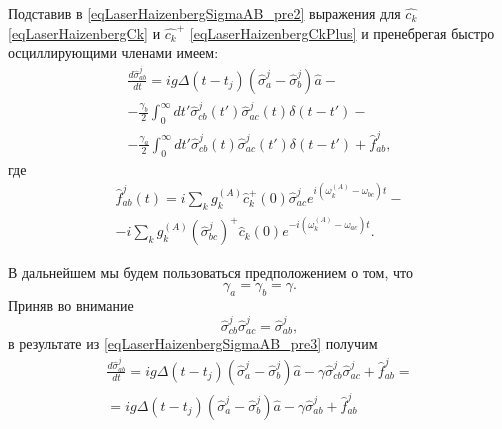 Подставив в \eqref{eqLaserHaizenbergSigmaAB_pre2} выражения для
$\hat{c_k}$ \eqref{eqLaserHaizenbergCk} и $\hat{c_k}^{+}$
\eqref{eqLaserHaizenbergCkPlus} и пренебрегая быстро осциллирующими
членами имеем:
\begin{eqnarray}
\frac{d \hat{\sigma}_{ab}^j}{d t} = 
i g 
\Delta\left(t - t_j\right) 
\left(\hat{\sigma}^{j}_{a} -
\hat{\sigma}^{j}_{b}\right)\hat{a} -
\nonumber \\
- \frac{\gamma_{b}}{2}
\int_0^{\infty}dt'
\hat{\sigma}^{j}_{cb}\left(t'\right)  
\hat{\sigma}^{j}_{ac}\left(t\right) 
\delta\left(t - t'\right) -
\nonumber \\ 
- \frac{\gamma_{a}}{2}
\int_0^{\infty}dt'
\hat{\sigma}^{j}_{cb}\left(t\right)  
\hat{\sigma}^{j}_{ac}\left(t'\right) 
\delta\left(t - t'\right) + \hat{f}_{ab}^{j},
\label{eqLaserHaizenbergSigmaAB_pre3}
\end{eqnarray}
где
\begin{eqnarray}
\hat{f}_{ab}^{j}\left(t\right) = 
i
\sum_{k}
g_k^{(A)}
\hat{c}_k^{+}\left(0\right)
\hat{\sigma}^{j}_{ac}  
e^{i\left(\omega_k^{(A)} - \omega_{bc}\right)t} -
\nonumber \\
-
 i
\sum_{k}
g_k^{(A)}
\left(\hat{\sigma}^{j}_{bc}\right)^{+}\hat{c}_k\left(0\right)
e^{-i\left(\omega_k^{(A)} - \omega_{ac}\right)t}.
\label{eqLaserHaizenbergFABJ}
\end{eqnarray}

В дальнейшем мы будем пользоваться предположением о том, что
\begin{equation}
\gamma_{a} =
\gamma_{b} = \gamma.
\label{eqLaserHaizenbergGamma}
\end{equation}
Приняв во внимание
\[
\hat{\sigma}^{j}_{cb}\hat{\sigma}^{j}_{ac} = 
\hat{\sigma}^{j}_{ab},
\]
в результате из \eqref{eqLaserHaizenbergSigmaAB_pre3} получим 
\begin{eqnarray}
\frac{d \hat{\sigma}_{ab}^j}{d t} = 
i g 
\Delta\left(t - t_j\right) 
\left(\hat{\sigma}^{j}_{a} -
\hat{\sigma}^{j}_{b}\right)\hat{a} 
- \gamma \hat{\sigma}^{j}_{cb}\hat{\sigma}^{j}_{ac} 
 + \hat{f}_{ab}^{j} = 
\nonumber \\
= 
i g 
\Delta\left(t - t_j\right) 
\left(\hat{\sigma}^{j}_{a} -
\hat{\sigma}^{j}_{b}\right)\hat{a} 
- \gamma \hat{\sigma}^{j}_{ab} 
 + \hat{f}_{ab}^{j}
\label{eqLaserHaizenbergSigmaABJ}
\end{eqnarray}

